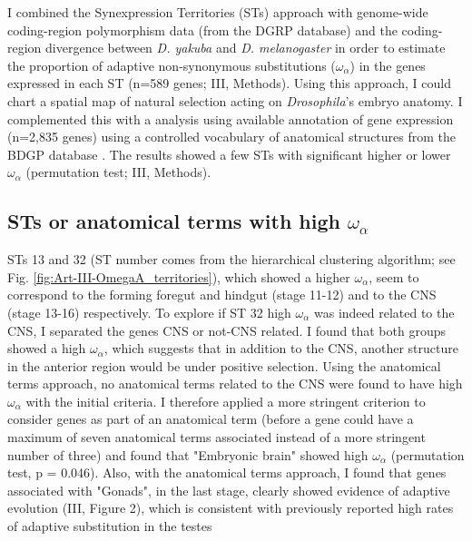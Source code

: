 
I combined the Synexpression Territories (STs) approach with genome-wide coding-region polymorphism data (from the DGRP database) and the coding-region divergence between \textit{D. yakuba} and \textit{D. melanogaster} in order to estimate the  proportion of adaptive non-synonymous substitutions ($\omega_{\alpha}$) in the genes expressed in each ST (n=589 genes; III, Methods).
Using this approach, I could chart a spatial map of natural selection acting on \textit{Drosophila}'s embryo anatomy.
I complemented this with a analysis using available annotation of gene expression (n=2,835 genes) using a controlled vocabulary of anatomical structures from the BDGP database \citep{Tomancak2007}.
The results showed a few STs with significant higher or lower $\omega_{\alpha}$ (permutation test; III, Methods).

\subsection{STs or anatomical terms with high {\large$\omega_{\alpha}$}}
STs 13 and 32 (ST number comes from the hierarchical clustering algorithm; see Fig. \ref{fig:Art-III-OmegaA_territories}), which showed a higher $\omega_{\alpha}$, seem to correspond to the forming foregut and hindgut (stage 11-12) and to the CNS (stage 13-16) respectively.
To explore if ST 32 high $\omega_{\alpha}$ was indeed related to the CNS, I separated the genes CNS or not-CNS related.
I found that both groups showed a high $\omega_{\alpha}$, which suggests that in addition to the CNS, another structure in the anterior region would be under positive selection.
Using the anatomical terms approach, no anatomical terms related to the CNS were found to have high $\omega_{\alpha}$ with the initial criteria.
I therefore applied a more stringent criterion to consider genes as part of an anatomical term (before a gene could have a maximum of seven anatomical terms associated instead of a more stringent number of three) and found that "Embryonic brain" showed high $\omega_{\alpha}$ (permutation test, p = 0.046).
Also, with the anatomical terms approach, I found that genes associated with "Gonads", in the last stage, clearly showed evidence of adaptive evolution (III, Figure 2), which is consistent with previously reported high rates of adaptive substitution in the testes \citep{Akashi1994,Civetta1995,Nuzhdin2004,Proschel2006}

